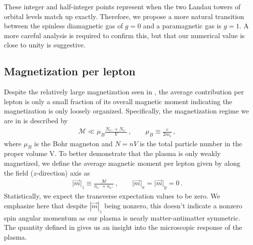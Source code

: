 These integer and half-integer points represent when the two Landau towers of orbital levels match up exactly. Therefore, we propose a more natural transition between the spinless diamagnetic gas of $g=0$ and a paramagnetic gas is $g=1$. A more careful analysis is required to confirm this, but that our numerical value is close to unity is suggestive.

\subsection{Magnetization per lepton}
\label{sec:perlepton}
\noindent Despite the relatively large magnetization seen in , the average contribution per lepton is only a small fraction of its overall magnetic moment indicating the magnetization is only loosely organized. Specifically, the magnetization regime we are in is described by
\begin{align}
 \label{fractionalmagnetization}
 \mathcal{M}\ll\mu_{B}\frac{N_{e^{+}}+N_{e^{-}}}{V}\,,\qquad\mu_{B}\equiv\frac{e}{2m_{e}}\,,
\end{align}
where $\mu_{B}$ is the Bohr magneton and $N=nV$ is the total particle number in the proper volume V. To better demonstrate that the plasma is only weakly magnetized, we define the average magnetic moment per lepton given by along the field ($z$-direction) axis as
\begin{align}
 \label{momentperlepton}
 \vert\vec{m}\vert_{z}\equiv\frac{\mathcal{M}}{n_{e^{-}}+n_{e^{+}}}\,,\qquad\vert\vec{m}\vert_{x}=\vert\vec{m}\vert_{y}=0\,.
\end{align}
Statistically, we expect the transverse expectation values to be zero. We emphasize here that despite $|\vec{m}|_{z}$ being nonzero, this doesn't indicate a nonzero spin angular momentum as our plasma is nearly matter-antimatter symmetric. The quantity defined in  gives us an insight into the microscopic response of the plasma.

